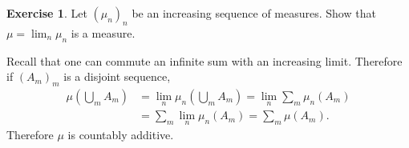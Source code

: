 \documentclass[10pt]{article}
\theoremstyle{definition}
\newtheorem{exer}{Exercise}
\begin{document}
\begin{exer}
Let $(\mu_n)_n$ be an increasing sequence of measures. Show that $\mu = \lim_n \mu_n$ is a measure.
\end{exer}

Recall that one can commute an infinite sum with an increasing limit. Therefore if $(A_m)_m$ is a disjoint sequence,
\begin{align*}
\mu\left(\bigcup_m A_m\right) &= \lim_n \mu_n\left(\bigcup_m A_m\right) = \lim_n \sum_m \mu_n(A_m)\\
&= \sum_m \lim_n \mu_n(A_m) = \sum_m \mu(A_m).
\end{align*}
Therefore $\mu$ is countably additive.
\end{document}
